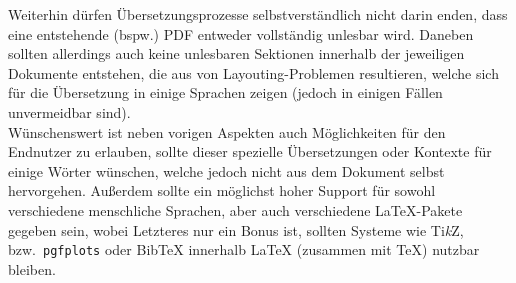 % 
Weiterhin dürfen Übersetzungsprozesse selbstverständlich nicht darin enden, dass eine entstehende (bspw.) PDF entweder vollständig unlesbar wird. %
Daneben sollten allerdings auch keine unlesbaren Sektionen innerhalb der jeweiligen Dokumente entstehen, die aus von Layouting-Problemen resultieren, welche sich für die Übersetzung in einige Sprachen zeigen (jedoch in einigen Fällen unvermeidbar sind).\\ 
\noindent
Wünschenswert ist neben vorigen Aspekten auch Möglichkeiten für den Endnutzer zu erlauben, sollte dieser spezielle Übersetzungen oder Kontexte für einige Wörter wünschen, welche jedoch nicht aus dem Dokument selbst hervorgehen. %
Außerdem sollte ein möglichst hoher Support für sowohl verschiedene menschliche Sprachen, aber auch verschiedene \LaTeX{}-Pakete gegeben sein, wobei Letzteres nur ein Bonus ist, sollten Systeme wie Ti\textit{k}Z, bzw.\ \texttt{pgfplots} oder Bib\TeX{} innerhalb \LaTeX{} (zusammen mit \TeX{}) nutzbar bleiben.%